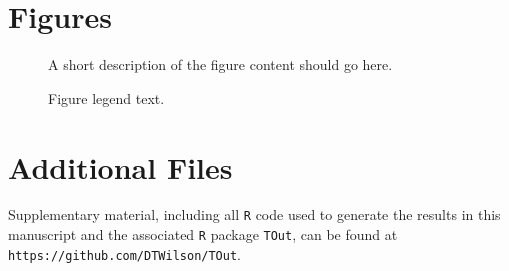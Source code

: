 \documentclass{bmcart}
\begin{document}
\begin{backmatter}



\section*{Figures}
  \begin{figure}[h!]
  \caption{
      A short description of the figure content
      should go here.}
      \end{figure}

\begin{figure}[h!]
  \caption{
      Figure legend text.}
      \end{figure}




\section*{Additional Files}

Supplementary material, including all \texttt{R} code used to generate the results in this manuscript and the associated \texttt{R} package \texttt{TOut}, can be found at \texttt{https://github.com/DTWilson/TOut}.

%


\end{backmatter}
\end{document}
